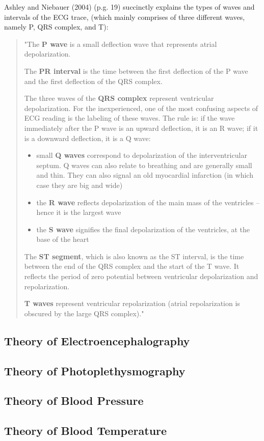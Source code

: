 Ashley and Niebauer (2004) (p.g. 19) \cite{ashley2004conquering} succinctly explains the types of waves and intervals of the ECG trace, (which mainly comprises of three different waves, namely P, QRS complex, and T): 

\blockquote{
"The {\bf P wave} is a small deflection wave that represents atrial depolarization. 

The {\bf PR interval} is the time between the first deflection of the P wave and the first deflection of the QRS complex. 

The three waves of the {\bf QRS complex} represent ventricular depolarization. For the inexperienced, one of the most confusing aspects of ECG reading is the labeling of these waves. The rule is: if the wave immediately after the P wave is an upward deflection, it is an R wave; if it is a downward deflection, it is a Q wave:

\begin{itemize}
	\item small {\bf Q waves} correspond to depolarization of the interventricular septum. Q waves can also relate to breathing and are generally small and thin. They can also signal an old myocardial infarction (in which case they are big and wide)
	\item the {\bf R wave} reflects depolarization of the main mass of the ventricles – hence it is the largest wave
	\item the {\bf S wave} signifies the final depolarization of the ventricles, at the base of the heart 
\end{itemize}

The {\bf ST segment}, which is also known as the ST interval, is the time between the end of the QRS complex and the start of the T wave. It reflects the period of zero potential between ventricular depolarization and repolarization. 

{\bf T waves} represent ventricular repolarization (atrial repolarization is obscured by the large QRS complex)." }


\subsection{Theory of Electroencephalography}

\subsection{Theory of Photoplethysmography}

\subsection{Theory of Blood Pressure}

\subsection{Theory of Blood Temperature}
